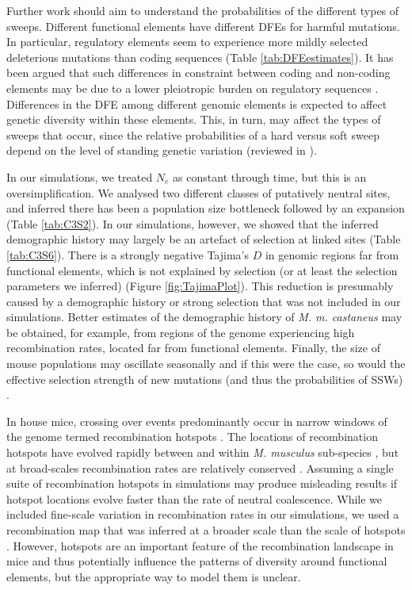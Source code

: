 	Further work should aim to understand the probabilities of the different types of sweeps. Different functional elements have different DFEs for harmful mutations. In particular, regulatory elements seem to experience more mildly selected deleterious mutations than coding sequences \citep{RN122, RN346} (Table \ref{tab:DFEestimates}). It has been argued that such differences in constraint between coding and non-coding elements may be due to a lower pleiotropic burden on regulatory sequences \citep{RN346}. Differences in the DFE among different genomic elements is expected to affect genetic diversity within these elements. This, in turn, may affect the types of sweeps that occur, since the relative probabilities of a hard versus soft sweep depend on the level of standing genetic variation (reviewed in \cite{RN336}). 

	In our simulations, we treated $N_e$ as constant through time, but this is an oversimplification. We analysed two different classes of putatively neutral sites, and inferred there has been a population size bottleneck followed by an expansion (Table \ref{tab:C3S2}). In our simulations, however, we showed that the inferred demographic history may largely be an artefact of selection at linked sites (Table \ref{tab:C3S6}). There is a strongly negative Tajima's $D$ in genomic regions far from functional elements, which is not explained by selection (or at least the selection parameters we inferred) (Figure \ref{fig:TajimaPlot}). This reduction is presumably caused by a demographic history or strong selection that was not included in our simulations. Better estimates of the demographic history of \textit{M. m. castaneus} may be obtained, for example, from regions of the genome experiencing high recombination rates, located far from functional elements. Finally, the size of mouse populations may oscillate seasonally \citep{RN392} and if this were the case, so would the effective selection strength of new mutations (and thus the probabilities of SSWs) \citep{RN350}. 

	In house mice, crossing over events predominantly occur in narrow windows of the genome termed recombination hotspots \cite{RN254}. The locations of recombination hotspots have evolved rapidly between and within \textit{M. musculus} sub-species \citep{RN249}, but at broad-scales recombination rates are relatively conserved \citep{RN340}. Assuming a single suite of recombination hotspots in simulations may produce misleading results if hotspot locations evolve faster than the rate of neutral coalescence. While we included fine-scale variation in recombination rates in our simulations, we used a recombination map that was inferred at a broader scale than the scale of hotspots \citep{RN340}. However, hotspots are an important feature of the recombination landscape in mice and thus potentially influence the patterns of diversity around functional elements, but the appropriate way to model them is unclear.

